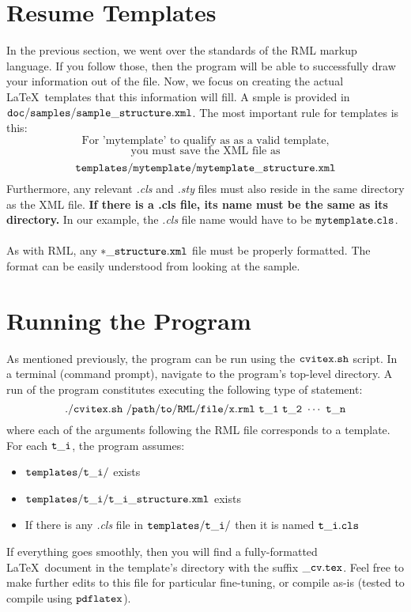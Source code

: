 \documentclass[12pt]{article}
\begin{document}
\section*{Resume Templates}
In the previous section, we went over the standards of the RML
markup language. If you follow those, then the program will be able
to successfully draw your information out of the file. Now, we focus
on creating the actual \LaTeX\ templates that this information will
fill. A smple is provided in $\tt{doc/samples/sample\_structure.xml}$.
The most important rule for templates is this:
$$\text{For 'mytemplate' to qualify as as a valid template,}$$
$$\text{you must save the XML file as}$$
$$\tt{templates/mytemplate/mytemplate\_structure.xml}$$
Furthermore, any relevant \textit{.cls} and \textit{.sty} files must also
reside in the same directory as the XML file. \textbf{If there is a .cls file, its name must be the same as its directory.}
In our example, the \textit{.cls} file name would have to be $\tt{mytemplate.cls}$.\\ \\
As with RML, any $\tt{*\_structure.xml}$ file must be properly formatted.
The format can be easily understood from looking at the sample.
\section*{Running the Program}
As mentioned previously, the program can be run using the $\tt{cvitex.sh}$ script. In a terminal (command prompt), navigate to the program's
top-level directory. A run of the program constitutes executing the
following type of statement:
$$\tt{./cvitex.sh\ /path/to/RML/file/x.rml\ t\_1\ t\_2\ \cdots\ t\_n}$$
where each of the arguments following the RML file corresponds to a
template. For each $\tt{t\_i}$, the program assumes:
\begin{itemize}
\item $\tt{templates/t\_i/}$ exists
\item $\tt{templates/t\_i/t\_i\_structure.xml}$ exists
\item If there is any \textit{.cls} file in $\tt{templates/t\_i/}$
      then it is named $\tt{t\_i.cls}$
\end{itemize}
If everything goes smoothly, then you will find a fully-formatted
\LaTeX\ document in the template's directory with the suffix
$\tt{\_cv.tex}$. Feel free to make further edits to this file for
particular fine-tuning, or compile as-is (tested to compile using
$\tt{pdflatex}$).
\end{document}
